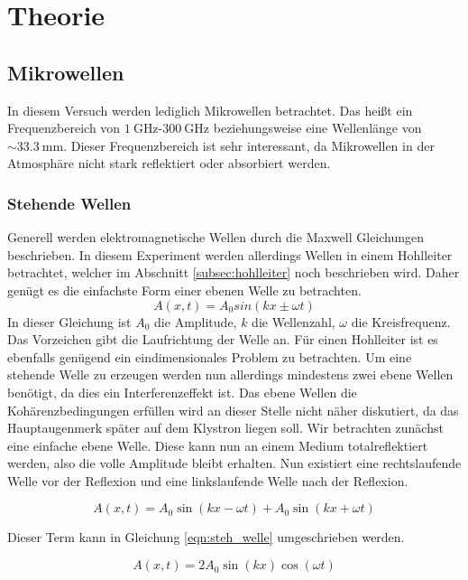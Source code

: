 \chapter{Theorie}
\label{cha:Theorie}
\section{Mikrowellen}
\label{sec:mikrowellen}
In diesem Versuch werden lediglich Mikrowellen betrachtet. Das heißt ein Frequenzbereich von $\qty{1}{\giga\hertz}$-$\qty{300}{\giga\hertz}$ beziehungsweise eine Wellenlänge von 
$\sim \qty{33.3}{\milli\metre}$. Dieser Frequenzbereich ist sehr interessant, da Mikrowellen in der Atmosphäre nicht stark reflektiert oder absorbiert werden.
\subsection{Stehende Wellen}
\label{subsec:stehende_Welle}
Generell werden elektromagnetische Wellen durch die Maxwell Gleichungen beschrieben. In diesem Experiment werden allerdings Wellen in einem Hohlleiter betrachtet, welcher im Abschnitt 
\ref{subsec:hohlleiter} noch beschrieben wird. Daher genügt es die einfachste Form einer ebenen Welle zu betrachten.
\begin{equation*}
              A(x,t) = A_0sin(kx\pm\omega t)
\end{equation*}
In dieser Gleichung ist $A_0$ die Amplitude, $k$ die Wellenzahl, $\omega$ die Kreisfrequenz. Das Vorzeichen gibt die Laufrichtung der Welle an. Für einen Hohlleiter ist es ebenfalls 
genügend ein eindimensionales Problem zu betrachten. Um eine stehende Welle zu erzeugen werden nun allerdings mindestens zwei ebene Wellen benötigt, da dies ein Interferenzeffekt ist.
Das ebene Wellen die Kohärenzbedingungen erfüllen wird an dieser Stelle nicht näher diskutiert, da das Hauptaugenmerk später auf dem Klystron liegen soll. Wir betrachten zunächst eine
einfache ebene Welle. Diese kann nun an einem Medium totalreflektiert werden, also die volle Amplitude bleibt erhalten. Nun existiert eine rechtslaufende Welle vor der Reflexion und
eine linkslaufende Welle nach der Reflexion. 

\begin{equation*}
              A(x,t) = A_0\sin(kx - \omega t) + A_0\sin(kx + \omega t)
\end{equation*}

Dieser Term kann in Gleichung \ref{eqn:steh_welle} umgeschrieben werden.

\begin{equation}
              \label{eqn:steh_welle}
              A(x,t) = 2A_0\sin(kx)\cos(\omega t)
\end{equation}

